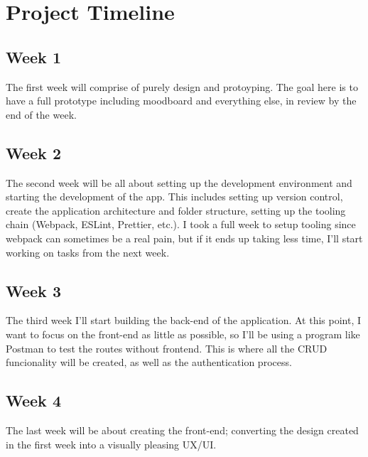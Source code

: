 \section{Project Timeline}

\subsection{Week 1}
The first week will comprise of purely design and protoyping.
The goal here is to have a full prototype including moodboard and everything else,
in review by the end of the week.

\subsection{Week 2}
The second week will be all about setting up the development environment and starting the development of the app.
This includes setting up version control, create the application architecture and folder structure, setting up the tooling
chain (Webpack, ESLint, Prettier, etc.).
I took a full week to setup tooling since webpack can sometimes be a real pain,
but if it ends up taking less time, I'll start working on tasks from the next week.

\subsection{Week 3}
The third week I'll start building the back-end of the application.
At this point, I want to focus on the front-end as little as possible, so I'll be
using a program like Postman to test the routes without frontend.
This is where all the CRUD funcionality will be created, as well as the
authentication process.

\subsection{Week 4}
The last week will be about creating the front-end; converting the design
created in the first week into a visually pleasing UX/UI.
